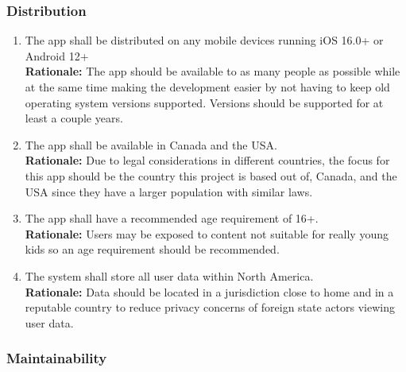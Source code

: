 \documentclass{article}
\begin{document}
\subsubsection{Distribution}
\label{ssub:distribution}


\begin{enumerate}[align=left, label=\textbf{DI-D\arabic*.}]
    \item The app shall be distributed on any mobile devices running iOS 16.0+ or Android 12+\\
    {\bf Rationale:} The app should be available to as many people as possible while at the same time making the development easier by not having to keep old operating system versions supported. Versions should be supported for at least a couple years.
    \item The app shall be available in Canada and the USA.\\
    {\bf Rationale:} Due to legal considerations in different countries, the focus for this app should be the country this project is based out of, Canada, and the USA since they have a larger population with similar laws.
    \item The app shall have a recommended age requirement of 16+.\\
    {\bf Rationale:} Users may be exposed to content not suitable for really young kids so an age requirement should be recommended.
    \item The system shall store all user data within North America.\\
    {\bf Rationale:} Data should be located in a jurisdiction close to home and in a reputable country to reduce privacy concerns of foreign state actors viewing user data.
\end{enumerate}

\subsubsection{Maintainability}

\end{document}
